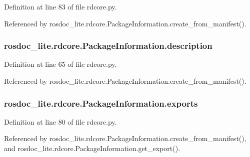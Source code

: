 Definition at line 83 of file rdcore.\+py.



Referenced by rosdoc\+\_\+lite.\+rdcore.\+Package\+Information.\+create\+\_\+from\+\_\+manifest().

\subsubsection[{\texorpdfstring{description}{description}}]{\setlength{\rightskip}{0pt plus 5cm}rosdoc\+\_\+lite.\+rdcore.\+Package\+Information.\+description}\hypertarget{classrosdoc__lite_1_1rdcore_1_1PackageInformation_a579d2604f2cfac815e8e3072c0833360}{}\label{classrosdoc__lite_1_1rdcore_1_1PackageInformation_a579d2604f2cfac815e8e3072c0833360}


Definition at line 65 of file rdcore.\+py.



Referenced by rosdoc\+\_\+lite.\+rdcore.\+Package\+Information.\+create\+\_\+from\+\_\+manifest().

\subsubsection[{\texorpdfstring{exports}{exports}}]{\setlength{\rightskip}{0pt plus 5cm}rosdoc\+\_\+lite.\+rdcore.\+Package\+Information.\+exports}\hypertarget{classrosdoc__lite_1_1rdcore_1_1PackageInformation_aa8aedabc1d5a9d4876b1a52560784272}{}\label{classrosdoc__lite_1_1rdcore_1_1PackageInformation_aa8aedabc1d5a9d4876b1a52560784272}


Definition at line 80 of file rdcore.\+py.



Referenced by rosdoc\+\_\+lite.\+rdcore.\+Package\+Information.\+create\+\_\+from\+\_\+manifest(), and rosdoc\+\_\+lite.\+rdcore.\+Package\+Information.\+get\+\_\+export().


